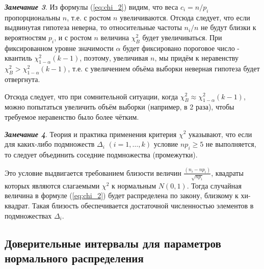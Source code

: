 \textbf{\textit{Замечание 3}}. Из формулы (\ref{eq:chi_2}) видим, что веса $c_i = n/p_{i}$ пропорциональны $n$, т.е. с ростом $n$ увеличиваются. Отсюда следует, что если выдвинутая гипотеза неверна, то относительные частоты $n_{i}/n$ не будут близки к вероятностям $p_{i}$, и с ростом $n$ величина  $\chi^{2}_{B}$  будет увеличиваться. При фиксированном уровне значимости $\alpha$ будет фиксировано пороговое число - квантиль $\chi^{2}_{1-\alpha}(k-1)$, поэтому, увеличивая $n$, мы придём к неравенству $\chi^{2}_{B} > \chi^{2}_{1-\alpha}(k-1)$, т.е. с увеличением объёма выборки неверная гипотеза будет отвергнута.

Отсюда следует, что при сомнительной ситуации, когда $\chi^{2}_{B} \approx \chi^{2}_{1-\alpha}(k-1)$, можно попытаться увеличить объём выборки (например, в 2 раза), чтобы требуемое неравенство было более чётким.

\textbf{\textit{Замечание 4}}. Теория и практика применения критерия  $\chi^{2}$ указывают, что если для каких-либо подмножеств $\Delta_{i}$ $(i = 1, \dots ,k)$ условие $np_{i} \geq 5$ не выполняется, то следует объединить соседние подмножества (промежутки).

Это условие выдвигается требованием близости величин $\frac{(n_{i} -np_{i})}{\sqrt{np_{i}}}$, квадраты которых являются слагаемыми $\chi^{2}$  к нормальным $N(0,1)$. Тогда случайная величина в формуле (\ref{eq:chi_2}) будет распределена по закону, близкому к хи-квадрат. Такая близость обеспечивается достаточной численностью элементов в подмножествах $\Delta_{i}$.

\subsection{Доверительные интервалы для параметров нормального распределения}

